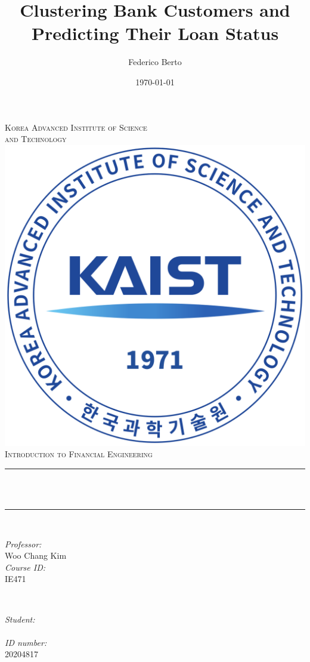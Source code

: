 \documentclass[12pt]{article}
\title{Clustering Bank Customers and
Predicting Their Loan Status}
\author{Federico Berto}
\date{\today}
\makeatletter
\newcommand{\professor}{Woo Chang Kim}
\newcommand{\studentid}{20204817}
\newcommand{\coursename}{Introduction to Financial Engineering}
\newcommand{\courseid}{IE471}
\newcommand{\firstuniversityline}{Korea Advanced Institute of Science} %
\newcommand{\seconduniversityline}{and Technology} %
\let\thetitle\@title
\let\theauthor\@author
\makeatother
\begin{document}
\begin{titlepage}
	\centering
    \textsc{\LARGE  \firstuniversityline \\ \smallskip \seconduniversityline}\\[1 cm]	%
    \includegraphics[scale = 0.18]{images/university_main_logo.png}\\[1.5 cm]	%
    
	\textsc{\Large \coursename}\\[0.5 cm]
	\rule{\linewidth}{0.2 mm} \\[0.4 cm]
	{ \huge \bfseries {\thetitle}}\\
	\rule{\linewidth}{0.2 mm} \\[1.5 cm]
	
	\begin{minipage}{0.5\textwidth}
		\begin{flushleft} \large
			\emph{Professor:}\\
		    \professor \\ [0.5cm]
            \emph{Course ID:}\\
            \courseid
			\end{flushleft}
			\end{minipage}~
			\begin{minipage}{0.4\textwidth}
			\begin{flushright} \large
			\emph{Student:} \\
			\theauthor \\[0.5cm]
			\emph{ID number:}\\
			\studentid \\
		\end{flushright}
	\end{minipage}\\[2 cm]
	
\end{titlepage}
\end{document}
